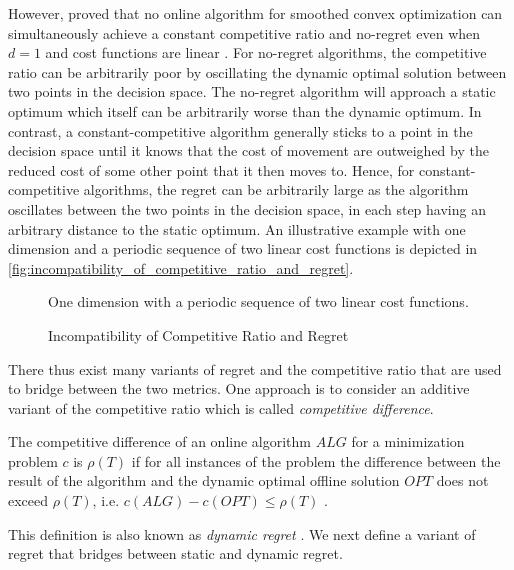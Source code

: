However, \citeauthor*{Andrew2015} proved that no online algorithm for smoothed convex optimization can simultaneously achieve a constant competitive ratio and no-regret even when $d = 1$ and cost functions are linear \cite{Andrew2015}. For no-regret algorithms, the competitive ratio can be arbitrarily poor by oscillating the dynamic optimal solution between two points in the decision space. The no-regret algorithm will approach a static optimum which itself can be arbitrarily worse than the dynamic optimum. In contrast, a constant-competitive algorithm generally sticks to a point in the decision space until it knows that the cost of movement are outweighed by the reduced cost of some other point that it then moves to. Hence, for constant-competitive algorithms, the regret can be arbitrarily large as the algorithm oscillates between the two points in the decision space, in each step having an arbitrary distance to the static optimum. An illustrative example with one dimension and a periodic sequence of two linear cost functions is depicted in \autoref{fig:incompatibility_of_competitive_ratio_and_regret}.

\begin{figure}
    \centering
    [TODO]

    One dimension with a periodic sequence of two linear cost functions.
    \caption{Incompatibility of Competitive Ratio and Regret}
    \label{fig:incompatibility_of_competitive_ratio_and_regret}
\end{figure}

There thus exist many variants of regret and the competitive ratio that are used to bridge between the two metrics. One approach is to consider an additive variant of the competitive ratio which is called \emph{competitive difference}.

\begin{definition}
The competitive difference of an online algorithm $ALG$ for a minimization problem $c$ is $\rho(T)$ if for all instances of the problem the difference between the result of the algorithm and the dynamic optimal offline solution $OPT$ does not exceed $\rho(T)$, i.e. $c(ALG) - c(OPT) \leq \rho(T)$ \cite{Chen2015}.
\end{definition}

This definition is also known as \emph{dynamic regret} \cite{Chen2018}. We next define a variant of regret that bridges between static and dynamic regret.

